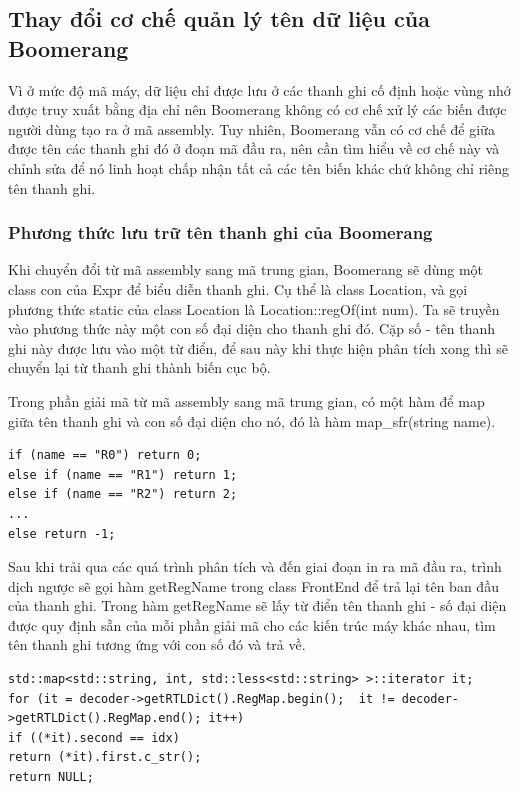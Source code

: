 \subsection{Thay đổi cơ chế quản lý tên dữ liệu của Boomerang}

Vì ở mức độ mã máy, dữ liệu chỉ được lưu ở các thanh ghi cố định hoặc vùng nhớ được truy xuất bằng địa chỉ nên Boomerang không có cơ chế xử lý các biến được người dùng tạo ra ở mã assembly. Tuy nhiên, Boomerang vẫn có cơ chế để giữa được tên các thanh ghi đó ở đoạn mã đầu ra, nên cần tìm hiểu về cơ chế này và chỉnh sửa để nó linh hoạt chấp nhận tất cả các tên biến khác chứ không chỉ riêng tên thanh ghi.

\subsubsection{Phương thức lưu trữ tên thanh ghi của Boomerang}
Khi chuyển đổi từ mã assembly sang mã trung gian, Boomerang sẽ dùng một class con của Expr để biểu diễn thanh ghi. Cụ thể là class Location, và gọi phương thức static của class Location là Location::regOf(int num). Ta sẽ truyền vào phương thức này một con số đại diện cho thanh ghi đó. Cặp số - tên thanh ghi này được lưu vào một từ điển, để sau này khi thực hiện phân tích xong thì sẽ chuyển lại từ thanh ghi thành biến cục bộ.

Trong phần giải mã từ mã assembly sang mã trung gian, có một hàm để map giữa tên thanh ghi và con số đại diện cho nó, đó là hàm map\_sfr(string name).
\begin{lstlisting}[caption={Một số phần mã trong hàm map\_sfr},label={list:listmapsfr}]
if (name == "R0") return 0;
else if (name == "R1") return 1;
else if (name == "R2") return 2;
...
else return -1;

\end{lstlisting}

Sau khi trải qua các quá trình phân tích và đến giai đoạn in ra mã đầu ra, trình dịch ngược sẽ gọi hàm getRegName trong class FrontEnd để trả lại tên ban đầu của thanh ghi. Trong hàm getRegName sẽ lấy từ điển tên thanh ghi - số đại diện được quy định sẵn của mỗi phần giải mã cho các kiến trúc máy khác nhau, tìm tên thanh ghi tương ứng với con số đó và trả về.
\begin{lstlisting}[caption={Phần mã trong hàm getRegName},label={list:listgetregname}]
std::map<std::string, int, std::less<std::string> >::iterator it;
for (it = decoder->getRTLDict().RegMap.begin();	 it != decoder->getRTLDict().RegMap.end(); it++)
if ((*it).second == idx) 
return (*it).first.c_str();
return NULL;
\end{lstlisting}


